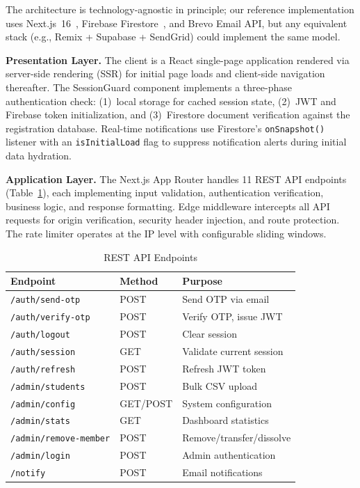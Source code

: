 \documentclass[conference]{IEEEtran}
\begin{document}
The architecture is technology-agnostic in principle; our reference implementation uses Next.js~16~\cite{nextjs}, Firebase Firestore~\cite{firebase}, and Brevo Email API, but any equivalent stack (e.g., Remix + Supabase + SendGrid) could implement the same model.

\textbf{Presentation Layer.} The client is a React single-page application rendered via server-side rendering (SSR) for initial page loads and client-side navigation thereafter. The SessionGuard component implements a three-phase authentication check: (1)~local storage for cached session state, (2)~JWT and Firebase token initialization, and (3)~Firestore document verification against the registration database. Real-time notifications use Firestore's \texttt{onSnapshot()} listener with an \texttt{isInitialLoad} flag to suppress notification alerts during initial data hydration.

\textbf{Application Layer.} The Next.js App Router handles 11 REST API endpoints (Table~\ref{tab:endpoints}), each implementing input validation, authentication verification, business logic, and response formatting. Edge middleware intercepts all API requests for origin verification, security header injection, and route protection. The rate limiter operates at the IP level with configurable sliding windows.

\begin{table}[htbp]
\centering
\caption{REST API Endpoints}
\label{tab:endpoints}
\footnotesize
\renewcommand{\arraystretch}{1.1}
\begin{tabular}{@{}lll@{}}
\toprule
\textbf{Endpoint} & \textbf{Method} & \textbf{Purpose} \\
\midrule
\texttt{/auth/send-otp} & POST & Send OTP via email \\
\texttt{/auth/verify-otp} & POST & Verify OTP, issue JWT \\
\texttt{/auth/logout} & POST & Clear session \\
\texttt{/auth/session} & GET & Validate current session \\
\texttt{/auth/refresh} & POST & Refresh JWT token \\
\texttt{/admin/students} & POST & Bulk CSV upload \\
\texttt{/admin/config} & GET/POST & System configuration \\
\texttt{/admin/stats} & GET & Dashboard statistics \\
\texttt{/admin/remove-member} & POST & Remove/transfer/dissolve \\
\texttt{/admin/login} & POST & Admin authentication \\
\texttt{/notify} & POST & Email notifications \\
\bottomrule
\end{tabular}
\end{table}
\end{document}
